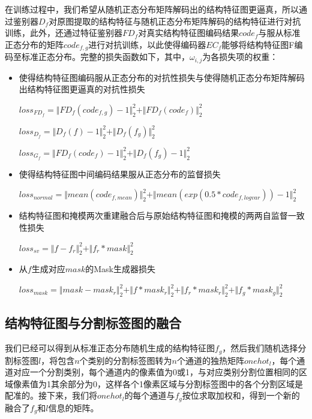 \documentclass[letterpaper]{article} %
\begin{document}
在训练过程中，我们希望从随机正态分布矩阵解码出的结构特征图更逼真，所以通过鉴别器$D_f$对原图提取的结构特征与随机正态分布矩阵解码的结构特征进行对抗训练，此外，还通过特征鉴别器$FD_f$对真实结构特征图编码结果$code_f$与服从标准正态分布的矩阵$code_{f,g}$进行对抗训练，以此使得编码器$EC_f$能够将结构特征图F编码至标准正态分布。完整的损失函数如下，其中，$\omega_{i,j}$为各损失项的权重：
\begin{itemize}
	\item 使得结构特征图编码服从正态分布的对抗性损失与使得随机正态分布矩阵解码出结构特征图更逼真的对抗性损失

\begin{center}
	$loss_{FD_f}=\Vert{FD_f(code_{f,g})-1}\Vert_{2}^{2}+\Vert{FD_f(code_f)}\Vert_{2}^{2}$
\end{center}

\begin{center}
	$loss_{D_f}=\Vert{D_f(f)-1}\Vert_{2}^{2}+\Vert{D_f(f_g )}\Vert_{2}^{2}$
\end{center}

\begin{center}
	$loss_{G_f}=\Vert{FD_f(code_f)-1}\Vert_{2}^{2}+\Vert{D_f(f_g)-1}\Vert_{2}^{2}$
\end{center}

	\item 使得结构特征图中间编码结果服从正态分布的监督损失

\begin{center}
	$loss_{normal}=\Vert{mean(code_{f,mean})}\Vert_{2}^{2}+ \Vert{mean(exp(0.5*code_{f,logvar}))-1}\Vert_{2}^{2}$
\end{center}

	\item 结构特征图和掩模两次重建融合后与原始结构特征图和掩模的两两自监督一致性损失

\begin{center}
	$loss_{sv}=\Vert{f-f_r}\Vert_{2}^{2}+\Vert{f_r*mask}\Vert_{2}^{2}$
\end{center}

	\item 从$f$生成对应$mask$的Mask生成器损失

\begin{center}
	$loss_{mask}=\Vert{mask-mask_r }\Vert_{2}^{2}+\Vert{f*mask_r}\Vert_{2}^{2}+\Vert{f_r*mask_r}\Vert_{2}^{2}+\Vert{f_g*mask_g}\Vert_{2}^{2}$
\end{center}

\end{itemize}

\subsection{结构特征图与分割标签图的融合}
我们已经可以得到从标准正态分布随机生成的结构特征图$f_g$，然后我们随机选择分割标签图$l$，将包含$n$个类别的分割标签图转为$n$个通道的独热矩阵$onehot_l$，每个通道对应一个分割类别，每个通道内的像素值为0或1，与对应类别分割位置相同的区域像素值为1其余部分为0，这样各个1像素区域与分割标签图中的各个分割区域是配准的。接下来，我们将$onehot_l$的每个通道与$f_g$按位求取加权和，得到一个新的融合了$f_g$和$l$信息的矩阵。
\end{document}
